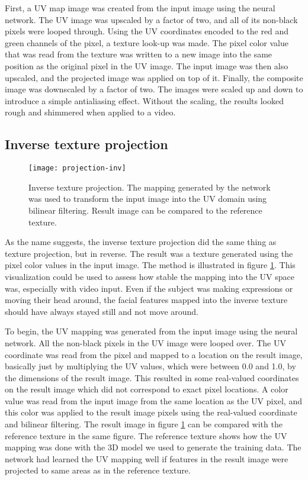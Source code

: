First, a UV map image was created from the input image using the neural network. The UV image was upscaled by a factor of two, and all of its non-black pixels were looped through. Using the UV coordinates encoded to the red and green channels of the pixel, a texture look-up was made. The pixel color value that was read from the texture was written to a new image into the same position as the original pixel in the UV image. The input image was then also upscaled, and the projected image was applied on top of it. Finally, the composite image was downscaled by a factor of two. The images were scaled up and down to introduce a simple antialiasing effect. Without the scaling, the results looked rough and shimmered when applied to a video.

\subsection{Inverse texture projection}

\begin{figure}
    \texttt{[image: projection-inv]}
    \caption[Inverse texture projection]{Inverse texture projection. The mapping generated by the network was used to transform the input image into the UV domain using bilinear filtering. Result image can be compared to the reference texture.}
    \label{fig:projection_inv_1}
\end{figure}

As the name suggests, the inverse texture projection did the same thing as texture projection, but in reverse. The result was a texture generated using the pixel color values in the input image. The method is illustrated in figure \ref{fig:projection_inv_1}. This visualization could be used to assess how stable the mapping into the UV space was, especially with video input. Even if the subject was making expressions or moving their head around, the facial features mapped into the inverse texture should have always stayed still and not move around.

To begin, the UV mapping was generated from the input image using the neural network. All the non-black pixels in the UV image were looped over. The UV coordinate was read from the pixel and mapped to a location on the result image, basically just by multiplying the UV values, which were between 0.0 and 1.0, by the dimensions of the result image. This resulted in some real-valued coordinates on the result image which did not correspond to exact pixel locations. A color value was read from the input image from the same location as the UV pixel, and this color was applied to the result image pixels using the real-valued coordinate and bilinear filtering. The result image in figure \ref{fig:projection_inv_1} can be compared with the reference texture in the same figure. The reference texture shows how the UV mapping was done with the 3D model we used to generate the training data. The network had learned the UV mapping well if features in the result image were projected to same areas as in the reference texture.

